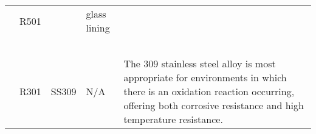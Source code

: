 {\begin{tabular}{@{}lp{5cm}p{2cm}p{2cm}p{12cm}@{}}
                                                      & R501                                                   &                                                                                        & glass lining                                      &                                                                                                                                                                                                                                                                                                                                                                                                                                                                                                                                                                                                                                                                                                                                                                                                                                                                                                                    \\ \\ \\ \\ \\ \\ \cmidrule(l){2-5}
                                                      & R301                                                   & \multirow[t]{2}{=}{SS309}                                                                 & \multirow[t]{2}{=}{N/A}                              & \multirow[t]{2}{=}{The 309 stainless steel alloy is most appropriate for environments in which there is an oxidation reaction occurring, offering both corrosive resistance and high temperature resistance.}                                                                                                                                                                                                                                                                                                                                                                                                                                                                                                                                                                                                                                                                                                          \\ \cmidrule(l){2-2}

\end{tabular}}
